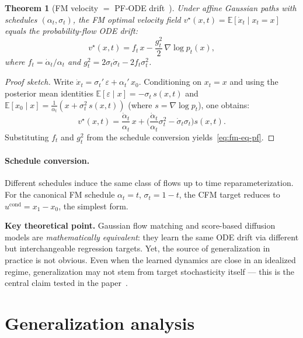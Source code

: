 \documentclass[10pt,a4paper]{article}
\newtheorem{theorem}{Theorem}
\theoremstyle{definition}
\newcommand{\E}{\mathbb{E}}
\begin{document}
\begin{theorem}[FM velocity $=$ PF-ODE drift~{\cite[Thm.~5.1]{lipman2024flow}}]\label{thm:equiv}
Under affine Gaussian paths with schedules $(\alpha_t, \sigma_t)$, the FM optimal velocity field $v^\star(x,t) = \E[\dot{x}_t \mid x_t = x]$ equals the probability-flow ODE drift:
\begin{equation}\label{eq:fm-eq-pf}
    \boxed{v^\star(x, t) = f_t\, x - \frac{g_t^2}{2}\,\nabla\log p_t(x),}
\end{equation}
where $f_t = \dot{\alpha}_t/\alpha_t$ and $g_t^2 = 2\sigma_t\dot{\sigma}_t - 2f_t\sigma_t^2$.
\end{theorem}

\begin{proof}[Proof sketch]
Write $\dot{x}_t = \sigma_t'\, \varepsilon + \alpha_t'\, x_0$.
Conditioning on $x_t = x$ and using the posterior mean identities $\E[\varepsilon \mid x] = -\sigma_t\, s(x,t)$ and $\E[x_0 \mid x] = \frac{1}{\alpha_t}(x + \sigma_t^2\, s(x,t))$ (where $s = \nabla\log p_t$), one obtains:
\[
    v^\star(x,t) = \frac{\dot{\alpha}_t}{\alpha_t}\,x + \Big(\frac{\dot{\alpha}_t}{\alpha_t}\sigma_t^2 - \dot{\sigma}_t\sigma_t\Big)s(x,t).
\]
Substituting $f_t$ and $g_t^2$ from the schedule conversion yields~\eqref{eq:fm-eq-pf}.
\end{proof}

\paragraph{Schedule conversion.}
Different schedules induce the same class of flows up to time reparameterization.
For the canonical FM schedule $\alpha_t = t$, $\sigma_t = 1-t$, the CFM target reduces to $u^{\mathrm{cond}} = x_1 - x_0$, the simplest form.

\begin{takeawaybox}
\textbf{Key theoretical point.}
Gaussian flow matching and score-based diffusion models are \emph{mathematically equivalent}: they learn the same ODE drift via different but interchangeable regression targets.
Yet, the source of generalization in practice is not obvious.
Even when the learned dynamics are close in an idealized regime, generalization may not stem from target stochasticity itself --- this is the central claim tested in the paper~\cite{bertrand2025closed}.
\end{takeawaybox}


\section{Generalization analysis}\label{sec:generalization}
\end{document}
